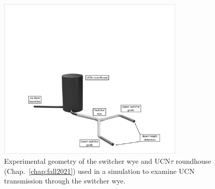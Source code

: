
 \begin{figure}
    \centering
    \includegraphics[width=0.8\textwidth]{figures/2021_west_beamline_pentrack.pdf}
    \caption
     {Experimental geometry of the switcher wye and UCN$\tau$ roundhouse (Chap.~\ref{chap:fall2021}) used in a \pentrack simulation to examine UCN transmission through the switcher wye.}
    \label{fig:west_beamline_pentrack_geometry}
\end{figure}

